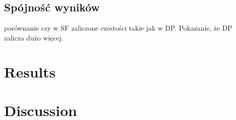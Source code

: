 \documentclass{pracalicmgr}
\begin{document}
    \section{Spójność wyników}
	porównanie czy w SF zaliczone czestości takie jak w DP. Pokazanie, że DP zalicza dużo więcej.
% 	
 
     
\chapter{Results}
    

    
    \section{}
	
    \section{}
    


    \chapter{Discussion}
    
    

\end{document}
